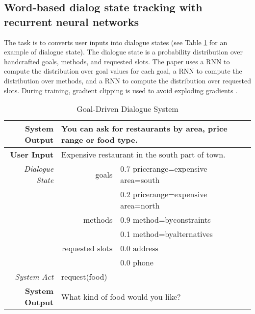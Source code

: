 \subsection{Word-based dialog state tracking with recurrent neural networks \cite{Henderson2014Word}}

The task is to converts user inputs into dialogue states (see Table \ref{Goal-Oriented Dialogue System Example} for an example of dialogue state). The dialogue state is a probability distribution over handcrafted goals, methods, and requested slots. The paper uses a RNN to compute the distribution over goal values for each goal, a RNN to compute the distribution over methods, and a RNN to compute the distribution over requested slots. During training, gradient clipping is used to avoid exploding gradients \cite{Pascanu2012Understanding}.

\begin{table}[!hbp]
\begin{tabular}{|r|rl|}
\hline
\textbf{System Output} & \multicolumn{2}{l|}{You can ask for restaurants by area, price range or food type.} \\
\hline
\textbf{User Input} & \multicolumn{2}{l|}{Expensive restaurant in the south part of town.} \\
\hline
\emph{Dialogue State} & goals
& 0.7 pricerange=expensive area=south \\
&& 0.2 pricerange=expensive area=north \\
& methods & 0.9 method=byconstraints \\
&& 0.1 method=byalternatives \\
& requested slots & 0.0 address \\
&& 0.0 phone \\
\hline
\emph{System Act} & \multicolumn{2}{l|}{request(food)} \\
\hline
\textbf{System Output} & \multicolumn{2}{l|}{What kind of food would you like?} \\
\hline
\end{tabular}
\caption{Goal-Driven Dialogue System} \label{Goal-Oriented Dialogue System Example}
\end{table}